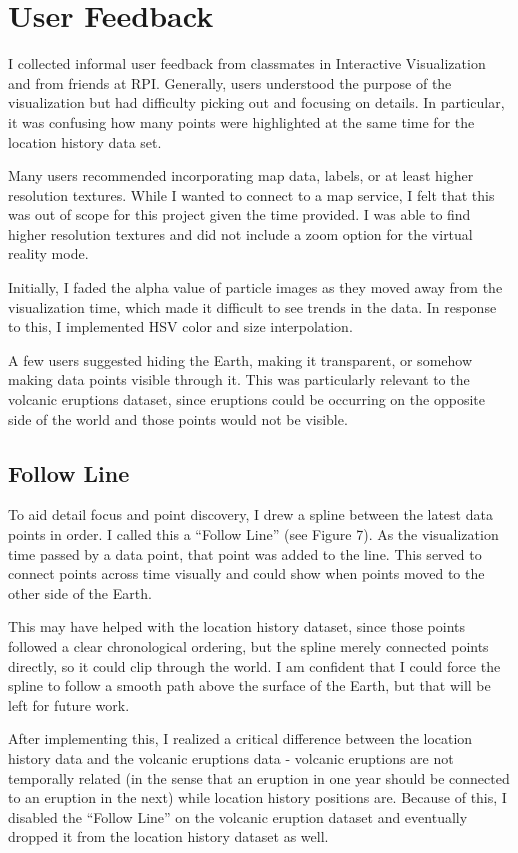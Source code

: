 \documentclass[conference]{acmsiggraph}
\begin{document}
\section{User Feedback}

I collected informal user feedback from classmates in Interactive Visualization
and from friends at RPI. Generally, users understood the purpose of the
visualization but had difficulty picking out and focusing on details. In
particular, it was confusing how many points were highlighted at the same time
for the location history data set.

Many users recommended incorporating map data, labels, or at least higher
resolution textures. While I wanted to connect to a map service, I felt that
this was out of scope for this project given the time provided. I was able to
find higher resolution textures and did not include a zoom option for the
virtual reality mode.

Initially, I faded the alpha value of particle images as they moved away from
the visualization time, which made it difficult to see trends in the data.
In response to this, I implemented HSV color and size interpolation.

A few users suggested hiding the Earth, making it transparent, or somehow
making data points visible through it. This was particularly relevant to the
volcanic eruptions dataset, since eruptions could be occurring on the opposite
side of the world and those points would not be visible.

\subsection{Follow Line}

To aid detail focus and point discovery, I drew a spline between the latest
data points in order. I called this a ``Follow Line'' (see Figure 7). As the
visualization time passed by a data point, that point was added to the line.
This served to connect points across time visually and could show when points
moved to the other side of the Earth.

This may have helped with the location history dataset, since those points
followed a clear chronological ordering, but the spline merely connected points
directly, so it could clip through the world. I am confident that I could
force the spline to follow a smooth path above the surface of the Earth, but
that will be left for future work.

After implementing this, I realized a critical difference between the location
history data and the volcanic eruptions data - volcanic eruptions are not
temporally related (in the sense that an eruption in one year should be
connected to an eruption in the next) while location history positions are.
Because of this, I disabled the ``Follow Line'' on the volcanic eruption dataset
and eventually dropped it from the location history dataset as well.
\end{document}
